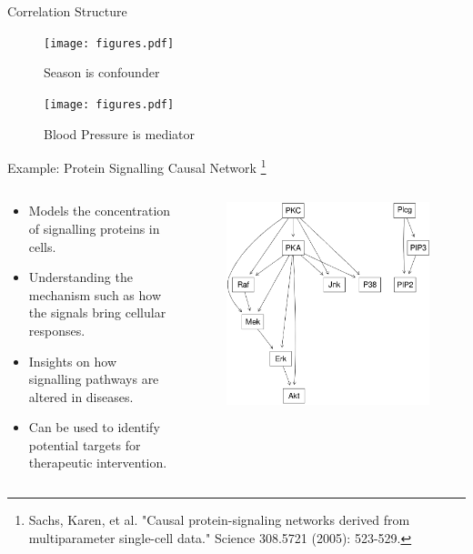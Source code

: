 \documentclass[aspectratio=169]{beamer}
\begin{document}
\begin{frame}{Correlation Structure}
	\begin{figure}
		\centering
		\texttt{[image: figures.pdf]}
		\caption{Season is confounder}
	\end{figure}
	\begin{figure}
		\centering
		\texttt{[image: figures.pdf]}
		\caption{Blood Pressure is mediator}
	\end{figure}
\end{frame}

\begin{frame}{Example: Protein Signalling Causal Network \footnote{Sachs, Karen, et al. "Causal protein-signaling networks derived from multiparameter single-cell data." Science 308.5721 (2005): 523-529.}}
	\begin{columns}
		\begin{column}{0.5\textwidth}
			\begin{itemize}
				\item Models the concentration of signalling proteins in cells.
				\item Understanding the mechanism such as how the signals bring cellular responses.
				\item Insights on how signalling pathways are altered in diseases.
				\item Can be used to identify potential targets for therapeutic intervention.
			\end{itemize}
		\end{column}
		\begin{column}{0.5\textwidth}
			\begin{figure}
				\centering
				\includegraphics[scale=0.22]{imgs/sachs.png}
			\end{figure}
		\end{column}
	\end{columns}
\end{frame}
\end{document}
